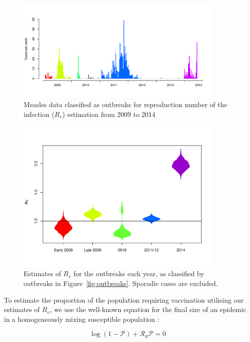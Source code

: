 \documentclass{article}
\newcommand{\Pe}{\mathcal{P}}
\newcommand{\Ro}{\mathcal{R}_0}
\begin{document}
\begin{figure}[H]
     \centering
     \includegraphics[width=0.9\textwidth]{outbreaks_for_R0.pdf}
     \caption{Measles data classified as outbreaks for reproduction number of the infection ($R_v$) estimation from 2009 to 2014}
     \label{fig:outbreaks}
\end{figure}

\begin{figure}[H]
     \centering
     \includegraphics[width=0.9\textwidth]{averageR0.pdf}
     \caption{Estimates of $R_v$ for the outbreaks each year, as classified by outbreaks in Figure~\autoref{fig:outbreaks}. Sporadic cases are excluded.}
     \label{fig:r0}
\end{figure}

To estimate the proportion of the population requiring vaccination utilising our estimates of $R_v$, we use the well-known equation for the final size of an epidemic in a homogeneously mixing susceptible population \citep{diekmann13}:

\begin{equation} \label{eq:eqn1}
\log\left(1-\Pe\right)+\Ro\Pe=0
\end{equation}
\end{document}

